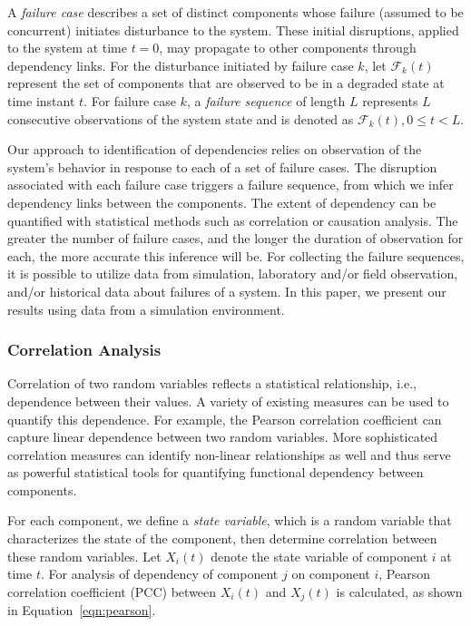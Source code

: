\documentclass[12pt]{elsarticle}
\begin{document}
A \emph{failure case} describes a set of distinct components whose failure (assumed to be concurrent) initiates disturbance to the system. These initial disruptions, applied to the system at time $t=0$, may propagate to other components through dependency links. For the disturbance initiated by failure case $k$, let $\mathcal{F}_{k}(t)$ represent the set of components that are observed to be in a degraded state at time instant $t$. For failure case $k$, a \emph{failure sequence} of length $L$ represents $L$ consecutive observations of the system state and is denoted as $\mathcal{F}_{k}(t), 0 \leq t < L$.

Our approach to identification of dependencies relies on observation of the system's behavior in response to each of a set of failure cases. The disruption associated with each failure case triggers a failure sequence, from which we infer dependency links between the components. The extent of dependency can be quantified with statistical methods such as correlation or causation analysis. The greater the number of failure cases, and the longer the duration of observation for each, the more accurate this inference will be. For collecting the failure sequences, it is possible to utilize data from simulation, laboratory and/or field observation, and/or historical data about failures of a system. In this paper, we present our results using data from a simulation environment.

\subsubsection{Correlation Analysis}
\label{sec:analysis:iden:corr}

Correlation of two random variables reflects a statistical relationship, i.e., dependence between their values. A variety of existing measures can be used to quantify this dependence. For example, the Pearson correlation coefficient can capture linear dependence between two random variables. More sophisticated correlation measures can identify non-linear relationships as well and thus serve as powerful statistical tools for quantifying functional dependency between components.

For each component, we define a \emph{state variable}, which is a random variable that characterizes the state of the component, then determine correlation between these random variables. Let $X_i(t)$ denote the state variable of component $i$ at time $t$. For analysis of dependency of component $j$ on component $i$, Pearson correlation coefficient (PCC) between $X_i(t)$ and $X_j(t)$ is calculated, as shown in Equation~\eqref{eqn:pearson}.
\end{document}
